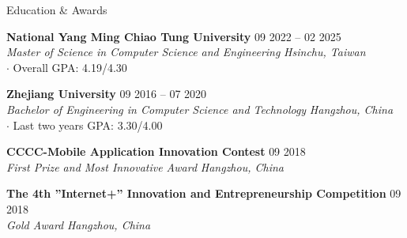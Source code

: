 \documentclass{resume}
\begin{document}
\vspace{-1em}
\begin{rSection}{Education \& Awards}

{\bf National Yang Ming Chiao Tung University} \hfill {09 2022 -- 02 2025}\\
{\textit{Master of Science in Computer Science and Engineering}} \hfill \textit{Hsinchu, Taiwan}\\
$\cdot$ Overall GPA: 4.19/4.30

{\bf Zhejiang University} \hfill {09 2016 -- 07 2020}\\
{\textit{Bachelor of Engineering in Computer Science and Technology}} \hfill \textit{Hangzhou, China}\\
$\cdot$ Last two years GPA: 3.30/4.00

{\bf CCCC-Mobile Application Innovation Contest} \hfill {09 2018}\\
{\textit{First Prize and Most Innovative Award}} \hfill \textit{Hangzhou, China}

{\bf The 4th ”Internet+” Innovation and Entrepreneurship Competition} \hfill {09 2018}\\
{\textit{Gold Award}} \hfill \textit{Hangzhou, China}

\end{rSection}
\end{document}
